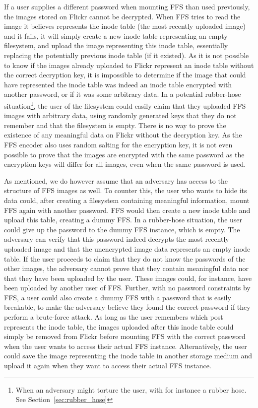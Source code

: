 If a user supplies a different password when mounting \gls{FFS} than used previously, the images stored on Flickr cannot be decrypted. When \gls{FFS} tries to read the image it believes represents the inode table (the most recently uploaded image) and it fails, it will simply create a new inode table representing an empty filesystem, and upload the image representing this inode table, essentially replacing the potentially previous inode table (if it existed). As it is not possible to know if the images already uploaded to Flickr represent an inode table without the correct decryption key, it is impossible to determine if the image that could have represented the inode table was indeed an inode table encrypted with another password, or if it was some arbitrary data. In a potential rubber-hose situation\footnote{When an adversary might torture the user, with for instance a rubber hose. See Section~\ref{sec:rubber_hose}}, the user of the filesystem could easily claim that they uploaded \gls{FFS} images with arbitrary data, using randomly generated keys that they do not remember and that the filesystem is empty. There is no way to prove the existence of any meaningful data on Flickr without the decryption key. As the \gls{FFS} encoder also uses random salting for the encryption key, it is not even possible to prove that the images are encrypted with the same password as the encryption keys will differ for all images, even when the same password is used. 

As mentioned, we do however assume that an adversary has access to the structure of \gls{FFS} images as well. To counter this, the user who wants to hide its data could, after creating a filesystem containing meaningful information, mount \gls{FFS} again with another password. \gls{FFS} would then create a new inode table and upload this table, creating a dummy \gls{FFS}. In a rubber-hose situation, the user could give up the password to the dummy \gls{FFS} instance, which is empty. The adversary can verify that this password indeed decrypts the most recently uploaded image and that the unencrypted image data represents an empty inode table. If the user proceeds to claim that they do not know the passwords of the other images, the adversary cannot prove that they contain meaningful data nor that they have been uploaded by the user. These images could, for instance, have been uploaded by another user of \gls{FFS}. Further, with no password constraints by \gls{FFS}, a user could also create a dummy \gls{FFS} with a password that is easily breakable, to make the adversary believe they found the correct password if they perform a brute-force attack. As long as the user remembers which post represents the inode table, the images uploaded after this inode table could simply be removed from Flickr before mounting \gls{FFS} with the correct password when the user wants to access their actual \gls{FFS} instance. Alternatively, the user could save the image representing the inode table in another storage medium and upload it again when they want to access their actual \gls{FFS} instance.

